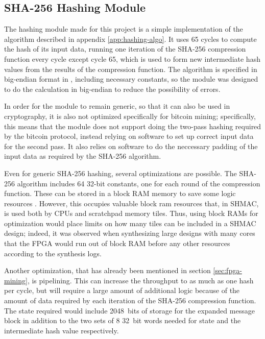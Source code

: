 \subsection{SHA-256 Hashing Module}

The hashing module made for this project is a simple implementation of the algorithm described in
appendix \ref{app:hashing-algo}. It uses 65 cycles to compute the hash of its input data, running
one iteration of the SHA-256 compression function every cycle except cycle 65, which is used to
form new intermediate hash values from the results of the compression function. The algorithm is
specified in big-endian format in \cite{fips180-4}, including necessary constants, so the module
was designed to do the calculation in big-endian to reduce the possibility of errors.

In order for the module to remain generic, so that it can also be used in cryptography, it
is also not optimized specifically for bitcoin mining; specifically, this means that the module
does not support doing the two-pass hashing required by the bitcoin protocol, instead relying
on software to set up correct input data for the second pass. It also relies on software to
do the neccessary padding of the input data as required by the SHA-256 algorithm.

Even for generic SHA-256 hashing, several optimizations are possible. The SHA-256 algorithm
includes 64 32-bit constants, one for each round of the compression function. These can be
stored in a block RAM memory to save some logic resources \cite{optimizing-sha2}. However, this occupies valuable
block ram resources that, in SHMAC, is used both by CPUs and scratchpad memory tiles. Thus,
using block RAMs for optimization would place limits on how many tiles can be included in
a SHMAC design; indeed, it was observed when synthesizing large designs with many cores
that the FPGA would run out of block RAM before any other resources according to the synthesis logs.

Another optimization, that has already been mentioned in section \ref{sec:fpga-mining}, is
pipelining. This can increase the throughput to as much as one hash per cycle, but will require
a large amount of additional logic because of the amount of data required by each iteration
of the SHA-256 compression function. The state required would include 2048~bits of storage
for the expanded message block in addition to the two sets of 8 32~bit words needed for
state and the intermediate hash value respectively.

